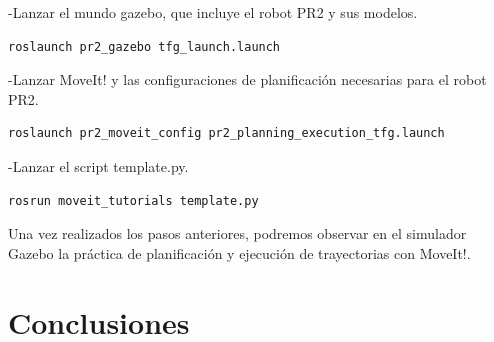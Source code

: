 \documentclass[12pt,spanish,chapterprefix, numbers=noenddot]{book}
\numberwithin{equation}{section}
\numberwithin{figure}{section}
\begin{document}
-Lanzar el mundo gazebo, que incluye el robot PR2 y sus modelos.
\vspace{20pt}
	\begin{lstlisting}[frame=single]
roslaunch pr2_gazebo tfg_launch.launch
    \end{lstlisting}
-Lanzar MoveIt! y las configuraciones de planificación necesarias para el robot PR2.
\vspace{20pt}
	\begin{lstlisting}[frame=single]
roslaunch pr2_moveit_config pr2_planning_execution_tfg.launch
    \end{lstlisting}
-Lanzar el script template.py.
	\begin{lstlisting}[frame=single]
rosrun moveit_tutorials template.py
    \end{lstlisting}
    

Una vez realizados los pasos anteriores, podremos observar en el simulador Gazebo la práctica de planificación y ejecución de trayectorias con MoveIt!. 

\chapter{Conclusiones}

\printbibliography[heading=bibintoc]
\printindex
\end{document}
